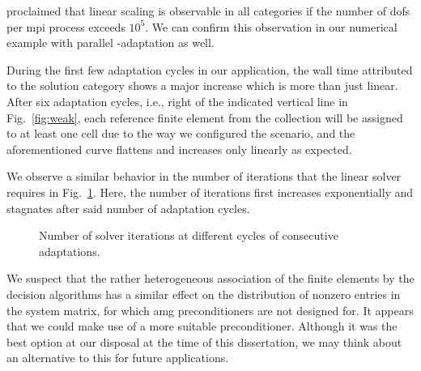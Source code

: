 \textcite{bangerth2012} proclaimed that linear scaling is observable in all categories if the number of \glspl{dof} per \gls{mpi} process exceeds $10^5$. We can confirm this observation in our numerical example with parallel \hp-adaptation as well.

During the first few adaptation cycles in our application, the wall time attributed to the solution category shows a major increase which is more than just linear. After six adaptation cycles, i.e., right of the indicated vertical line in Fig.~\ref{fig:weak}, each reference finite element from the collection will be assigned to at least one cell due to the way we configured the scenario, and the aforementioned curve flattens and increases only linearly as expected.

We observe a similar behavior in the number of iterations that the linear solver requires in Fig.~\ref{fig:solveriterations}. Here, the number of iterations first increases exponentially and stagnates after said number of adaptation cycles.

\begin{figure}
\centering

\caption[Number of solver iterations at different cycles of consecutive adaptations.]{Number of solver iterations at different cycles of consecutive adaptations.}
\label{fig:solveriterations}
\end{figure}



We suspect that the rather heterogeneous association of the finite elements by the decision algorithms
has a similar effect on the distribution of nonzero entries in the system matrix, for which \gls{amg} preconditioners are not designed for. It appears that we could make use of a more suitable preconditioner. Although it was the best option at our disposal at the time of this dissertation, we may think about an alternative to this for future applications.

